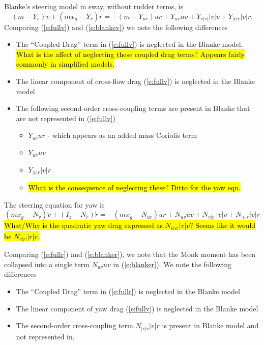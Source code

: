 \documentclass[11pt,draftcls,journal,onecolumn]{IEEEtran}
\begin{document}
Blanke's steering model in sway, without rudder terms, is
\begin{equation}
(m-Y_{\dot{v}}) \dot{v} + (m x_g - Y_{\dot{r}}) \dot{r}
=
-(m -Y_{ur})ur + Y_{uv}uv + Y_{v|v|}|v|v + Y_{|v|r}|v|r.
\label{e:blankev}
\end{equation}
Comparing (\ref{e:fullv}) and (\ref{e:blankev}) we note the following differences
\begin{itemize}
\item The ``Coupled Drag'' term in (\ref{e:fullv}) is neglected in the Blanke model. \hl{What is the affect of neglecting these coupled drag terms? Appears fairly commonly in simplified models.}
\item The linear component of cross-flow drag (\ref{e:fullv}) is neglected in the Blanke model
\item The following second-order cross-coupling terms are present in Blanke that are not represented in  (\ref{e:fullv})
  \begin{itemize}
    \item $Y_{ur}ur$ - which appears as an added mass Coriolis term
    \item $Y_{uv}uv$
    \item $Y_{|v|r}|v|r$
    \item \hl{What is the consequence of neglecting these? 
Ditto for the yaw eqn.}
  \end{itemize}
\end{itemize}
The steering equation for yaw is
\begin{equation}
(m x_g - N_{\dot{v}})\dot{v} + (I_z - N_{\dot{r}})\dot{r}
=
-(m x_g - N_{ur})ur + N_{uv}uv + N_{v|v|}|v|v + N_{|v|r}|v|r
\label{e:blanker}
\end{equation}
\hl{What/Why is the quadratic yaw drag expressed as $N_{v|v|}|v|v$?  Seems like it would be $N_{r|r|}|r|r$.}

\noindent
Comparing (\ref{e:fullr}) and (\ref{e:blanker}), we note that the Monk moment has been collapsed into a single term $N_{uv}uv$ in (\ref{e:blanker}).  We note the following differences
\begin{itemize}
\item The ``Coupled Drag'' term in (\ref{e:fullr}) is neglected in the Blanke model
\item The linear component of yaw drag (\ref{e:fullv}) is neglected in the Blanke model
\item The second-order cross-coupling term $N_{|v|r}|v|r$ is present in Blanke model and not represented in.
\end{itemize}
\end{document}

